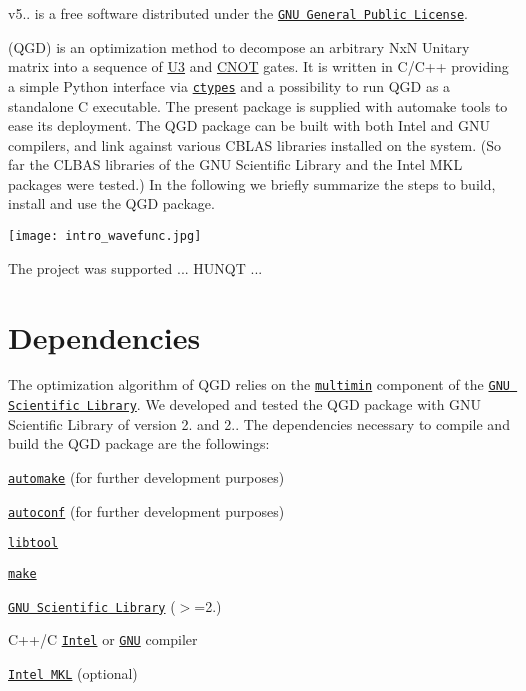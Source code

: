 v5.. is a free software distributed under the \href{http://www.gnu.org/licenses/}{\tt G\+NU General Public License}.

(Q\+GD) is an optimization method to decompose an arbitrary NxN Unitary matrix into a sequence of \hyperlink{class_u3}{U3} and \hyperlink{class_c_n_o_t}{C\+N\+OT} gates. It is written in C/\+C++ providing a simple Python interface via \href{https://docs.python.org/3/library/ctypes.html}{\tt ctypes} and a possibility to run Q\+GD as a standalone C executable. The present package is supplied with automake tools to ease its deployment. The Q\+GD package can be built with both Intel and G\+NU compilers, and link against various C\+B\+L\+AS libraries installed on the system. (So far the C\+L\+B\+AS libraries of the G\+NU Scientific Library and the Intel M\+KL packages were tested.) In the following we briefly summarize the steps to build, install and use the Q\+GD package.

 
\begin{DoxyImageNoCaption}
  \mbox{\texttt{[image: intro\_wavefunc.jpg]}}
\end{DoxyImageNoCaption}


The project was supported ... H\+U\+N\+QT ...

\section*{Dependencies}

The optimization algorithm of Q\+GD relies on the \href{https://www.gnu.org/software/gsl/doc/html/multimin.html}{\tt multimin} component of the \href{https://www.gnu.org/software/gsl/doc/html/index.html}{\tt G\+NU Scientific Library}. We developed and tested the Q\+GD package with G\+NU Scientific Library of version 2. and 2.. The dependencies necessary to compile and build the Q\+GD package are the followings\+:


\begin{DoxyItemize}
\item \href{https://www.gnu.org/software/automake/}{\tt automake} (for further development purposes)
\item \href{https://www.gnu.org/software/autoconf/}{\tt autoconf} (for further development purposes)
\item \href{https://www.gnu.org/software/libtool/}{\tt libtool}
\item \href{https://www.gnu.org/software/make/}{\tt make}
\item \href{https://www.gnu.org/software/gsl/doc/html/index.html}{\tt G\+NU Scientific Library} ($>$=2.)
\item C++/C \href{https://software.intel.com/content/www/us/en/develop/tools/compilers/c-compilers.html}{\tt Intel} or \href{https://gcc.gnu.org/}{\tt G\+NU} compiler
\item \href{https://software.intel.com/content/www/us/en/develop/tools/math-kernel-library.html}{\tt Intel M\+KL} (optional)
\end{DoxyItemize}

